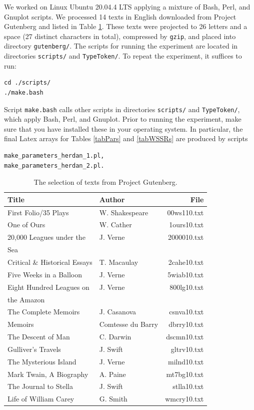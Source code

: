\documentclass[a4paper,12pt]{article}
\newcommand{\toprule}{\hline}
\newcommand{\midrule}{\hline}
\newcommand{\botrule}{\hline}
\begin{document}
We worked on Linux Ubuntu 20.04.4 LTS applying a mixture of Bash,
Perl, and Gnuplot scripts.  We processed 14 texts in English
downloaded from Project Gutenberg \citep{Gutenberg11} and listed in
Table \ref{tabTexts}. These texts were projected to 26 letters and a
space (27 distinct characters in total), compressed by \verb}gzip},
and placed into directory \verb}gutenberg/}.  The scripts for running
the experiment are located in directories \verb}scripts/} and
\verb}TypeToken/}. To repeat the experiment, it suffices to run:
\begin{verbatim}
cd ./scripts/
./make.bash
\end{verbatim}
Script \verb}make.bash} calls other scripts in directories
\verb}scripts/} and \verb}TypeToken/}, which apply Bash, Perl, and
Gnuplot. Prior to running the experiment, make sure that you have
installed these in your operating system.  In particular, the final
Latex arrays for Tables \ref{tabPars} and \ref{tabWSSRs} are produced
by scripts
\begin{verbatim}
make_parameters_herdan_1.pl,
make_parameters_herdan_2.pl.
\end{verbatim}

\begin{table}[t]
\caption{The selection of texts from Project
  Gutenberg.\label{tabTexts}}
\centering
\medskip
\begin{tabular}{|l|l|r|}
  \toprule
  Title &Author &File \\
  \midrule
  First Folio/35 Plays &W. Shakespeare & {00ws110.txt} \\
  One of Ours&W. Cather & {1ours10.txt} \\
  20,000 Leagues under the &J. Verne & {2000010.txt} \\
  \hfill Sea & & \\
  Critical \& Historical Essays &T. Macaulay & {2cahe10.txt} \\
  Five Weeks in a Balloon &J. Verne & {5wiab10.txt} \\
  Eight Hundred Leagues on &J. Verne & {800lg10.txt} \\
  \hfill the Amazon & & \\
  The Complete Memoirs &J. Casanova & {csnva10.txt} \\
  Memoirs &Comtesse du Barry & {dbrry10.txt} \\
  The Descent of Man &C. Darwin & {dscmn10.txt} \\
  Gulliver's Travels &J. Swift & {gltrv10.txt} \\
  The Mysterious Island &J. Verne & {milnd10.txt} \\
  Mark Twain, A Biography &A. Paine & {mt7bg10.txt} \\
  The Journal to Stella &J. Swift & {stlla10.txt} \\
  Life of William Carey &G. Smith & {wmcry10.txt} \\
  \botrule
\end{tabular}  
\end{table}
\end{document}
